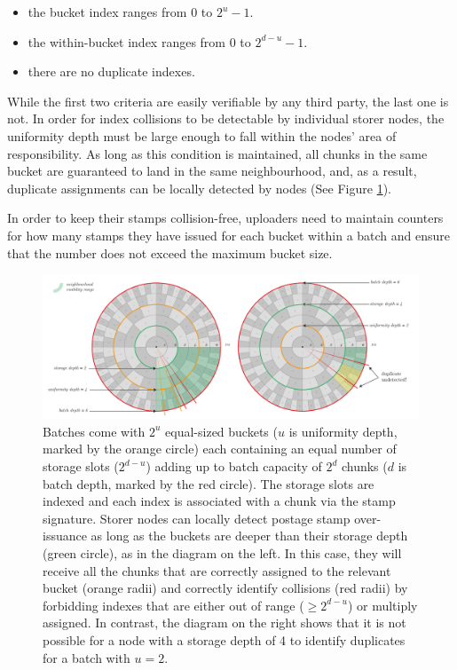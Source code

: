 \begin{itemize}
\item the bucket index ranges from $0$ to $2^u - 1$. 
\item the within-bucket index ranges from $0$ to $2^{d-u} - 1$. 
\item there are no duplicate indexes. 
\end{itemize}

While the first two criteria are easily verifiable by any third party, the last one is not. In order for index collisions to be detectable by individual storer nodes, the uniformity depth must be large enough to fall within the nodes' area of responsibility.
As long as this condition is maintained, all chunks in the same bucket are guaranteed to land in the same neighbourhood, and, as a result, duplicate assignments can be locally detected by nodes (See Figure \ref{fig:over-issuance}).

In order to keep their stamps collision-free, uploaders need to maintain counters for how many stamps they have issued for each bucket within a batch and ensure that the number does not exceed the maximum bucket size. 

\begin{figure}[!ht]
  \centering
    \includegraphics[width=1\textwidth]{fig/batch-structure.pdf}
  \caption[Batch structure, uniformity and over-issuance]{Batches come with $2^u$ equal-sized buckets ($u$ is uniformity depth, marked by the orange circle) each containing an equal number of storage slots ($2^{d-u}$) adding up to batch capacity of $2^d$ chunks ($d$ is batch depth, marked by the red circle). The storage slots are indexed and each index is associated with a chunk via the stamp signature. Storer nodes can locally detect postage stamp over-issuance as long as the buckets are deeper than their storage depth (green circle), as in the diagram on the left. In this case, they will receive all the chunks that are correctly assigned to the relevant bucket (orange radii) and correctly identify collisions (red radii) by forbidding indexes that are either out of range ($\geq 2^{d-u}$) or multiply assigned. In contrast, the diagram on the right shows that it is not possible for a node with a storage depth of 4 to identify duplicates for a batch with $u=2$.}
\label{fig:over-issuance}
\end{figure}    



